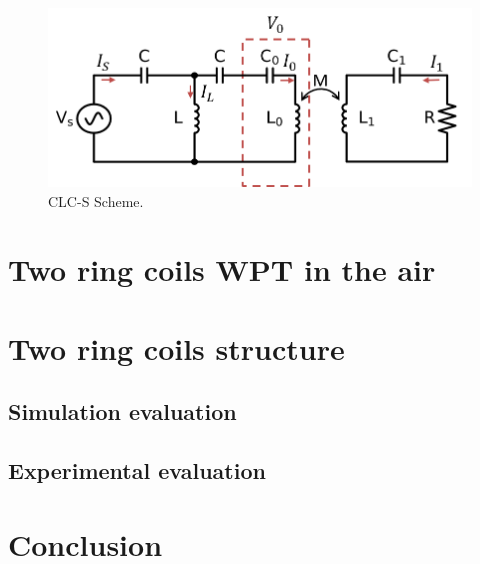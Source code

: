 \begin{figure}[htbp]
    \centering
    \includegraphics[width=0.8\linewidth]{images/3_clc_s_scheme.png}
    \caption{CLC-S Scheme.}
    \label{fig:3_clc_s_scheme}
\end{figure}


\section{Two ring coils WPT in the air}
\section{Two ring coils structure}
\subsection{Simulation evaluation}
\subsection{Experimental evaluation}

\section{Conclusion}
